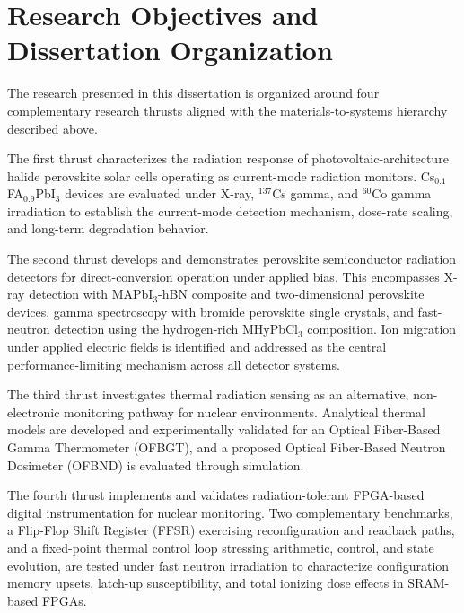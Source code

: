 \section{Research Objectives and Dissertation Organization}

The research presented in this dissertation is organized around four
complementary research thrusts aligned with the materials-to-systems
hierarchy described above.

The first thrust characterizes the radiation response of
photovoltaic-architecture halide perovskite solar cells operating as
current-mode radiation monitors.  Cs$_{0.1}$FA$_{0.9}$PbI$_3$ devices
are evaluated under X-ray, $^{137}$Cs gamma, and $^{60}$Co gamma
irradiation to establish the current-mode detection mechanism,
dose-rate scaling, and long-term degradation behavior.

The second thrust develops and demonstrates perovskite semiconductor
radiation detectors for direct-conversion operation under applied bias.
This encompasses X-ray detection with MAPbI$_3$-hBN composite and
two-dimensional perovskite devices, gamma spectroscopy with bromide
perovskite single crystals, and fast-neutron detection using the
hydrogen-rich MHyPbCl$_3$ composition.  Ion migration under applied
electric fields is identified and addressed as the central
performance-limiting mechanism across all detector systems.

The third thrust investigates thermal radiation sensing as an
alternative, non-electronic monitoring pathway for nuclear environments.
Analytical thermal models are developed and experimentally validated for
an Optical Fiber-Based Gamma Thermometer (OFBGT), and a proposed Optical
Fiber-Based Neutron Dosimeter (OFBND) is evaluated through simulation.

The fourth thrust implements and validates radiation-tolerant FPGA-based
digital instrumentation for nuclear monitoring.  Two complementary
benchmarks, a Flip-Flop Shift Register (FFSR) exercising
reconfiguration and readback paths, and a fixed-point thermal control
loop stressing arithmetic, control, and state evolution, are tested
under fast neutron irradiation to characterize configuration memory
upsets, latch-up susceptibility, and total ionizing dose effects in
SRAM-based FPGAs.

